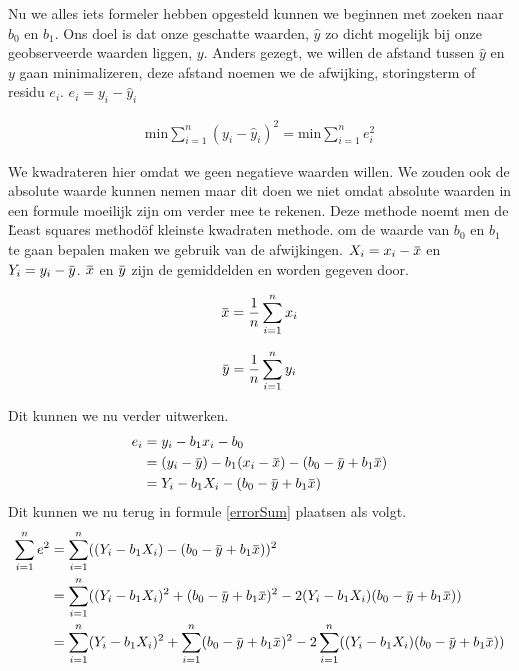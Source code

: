 \documentclass[11pt]{report}
\newcommand{\overbar}[1]{\mkern 1.5mu\overline{\mkern-1.5mu#1\mkern-1.5mu}\mkern 1.5mu}
\newcommand{\pbr}{\hfill\break\hfill\break}
\newcommand{\lbr}{\hfill\break}
\begin{document}
Nu we alles iets formeler hebben opgesteld kunnen we beginnen met zoeken naar $b_0$ en $b_1$. Ons doel is dat onze geschatte waarden, $\hat{y}$ zo dicht mogelijk bij onze geobserveerde waarden liggen, $y$. Anders gezegt, we willen de afstand tussen $\hat{y}$ en $y$ gaan minimalizeren, deze afstand noemen we de afwijking, storingsterm of residu $e_i$. $e_i = y_i -\hat{y}_i$
\begin{ceqn}
  \begin{align}
    \text{min} \sum_{i=1}^n(y_i - \hat{y}_i)^2 = \text{min} \sum_{i=1}^ne_i^2
    \label{errorSum}
  \end{align}
\end{ceqn}
We kwadrateren hier omdat we geen negatieve waarden willen. We zouden ook de absolute waarde kunnen nemen maar dit doen we niet omdat absolute waarden in een formule moeilijk zijn om verder mee te rekenen. Deze methode noemt men de \"Least squares method\" of kleinste kwadraten methode.
\pbr
om de waarde van $b_0$ en $b_1$ te gaan bepalen maken we gebruik van de afwijkingen.\lbr
$X_i = x_i - \overbar{x}$ en $Y_i = y_i - \overbar{y}$. $\overbar{x}$ en $\overbar{y}$ zijn de gemiddelden en worden gegeven door.\lbr
\noindent\begin{minipage}{.5\linewidth}
  \begin{equation*}
    \overbar{x} = \frac{1}{n}\sum_{i=1}^{n}x_i
  \end{equation*}
\end{minipage}%
\begin{minipage}{.5\linewidth}
  \begin{equation*}
    \overbar{y} = \frac{1}{n}\sum_{i=1}^{n}y_i
  \end{equation*}
\end{minipage}
Dit kunnen we nu verder uitwerken.
\begin{equation*}
  \begin{split}
    e_i &= y_i - b_1x_i - b_0\\
    &= (y_i - \overbar{y}) - b_1(x_i - \overbar{x})-(b_0 - \overbar{y} + b_1\overbar{x})\\
    &= Y_i - b_1X_i - (b_0 - \overbar{y} + b_1\overbar{x})
  \end{split}
\end{equation*}
Dit kunnen we nu terug in formule \ref{errorSum} plaatsen als volgt.
\begin{equation*}
  \begin{split}
    \sum_{i=1}^{n}e^2 &= \sum_{i=1}^n((Y_i - b_1X_i)-(b_0 - \overbar{y} + b_1\overbar{x}))^2\\
    &= \sum_{i=1}^n((Y_i - b_1X_i)^2 + (b_0 - \overbar{y} + b_1\overbar{x})^2 - 2(Y_i - b_1X_i)(b_0 - \overbar{y} + b_1\overbar{x}))\\
    &= \sum_{i=1}^n(Y_i - b_1X_i)^2 + \sum_{i=1}^n(b_0 - \overbar{y} + b_1\overbar{x})^2 - 2\sum_{i=1}^n((Y_i - b_1X_i)(b_0 - \overbar{y} + b_1\overbar{x}))\\
  \end{split}
\end{equation*}
\end{document}
